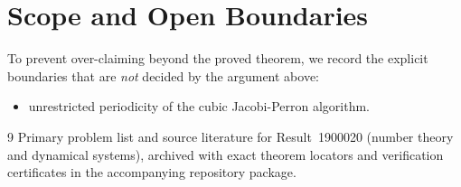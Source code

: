 \documentclass[10pt,reqno]{amsart}
\theoremstyle{definition}
\begin{document}
\section{Scope and Open Boundaries}

To prevent over-claiming beyond the proved theorem, we record the explicit boundaries that are \emph{not} decided by the argument above:
\begin{itemize}
  \item unrestricted periodicity of the cubic Jacobi-Perron algorithm.
\end{itemize}

\begin{thebibliography}{9}
Primary problem list and source literature for Result~1900020 (number theory and dynamical systems), archived with exact theorem locators and verification certificates in the accompanying repository package.
\end{thebibliography}
\end{document}
